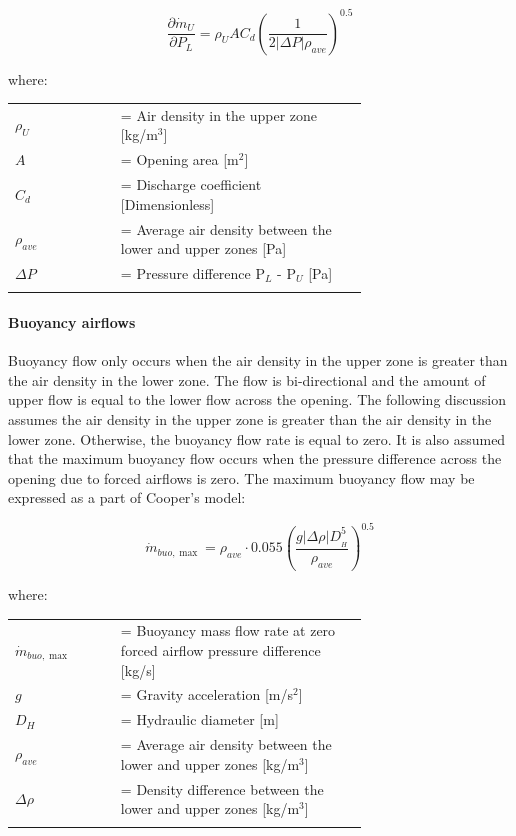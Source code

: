 \begin{equation}
\frac{{\partial \dot{m}_U}}{{\partial {P_L}}} = {\rho_U}A{C_d}{\left( {\frac{1}{{2\left| {\Delta P} \right|{\rho_{ave}}}}} \right)^{0.5}}
\end{equation}

where:
\begin{tabular}{lp{0.7\linewidth}}
\\
$\rho_U$ &= Air density in the upper zone [kg/m\(^{3}\)]\\
$A$ &= Opening area [m\(^{2}\)] \\
$C_{d}$ &= Discharge coefficient [Dimensionless] \\
$\rho_{ave}$ &= Average air density between the lower and upper zones [Pa] \\
$\Delta P$ &= Pressure difference P\(_{L}\) - P\(_{U}\) [Pa] \\
\\
\end{tabular}

\paragraph{Buoyancy airflows}\label{buoyancy-airflows}

Buoyancy flow only occurs when the air density in the upper zone is greater than the air density in the lower zone. The flow is bi-directional and the amount of upper flow is equal to the lower flow across the opening. The following discussion assumes the air density in the upper zone is greater than the air density in the lower zone. Otherwise, the buoyancy flow rate is equal to zero. It is also assumed that the maximum buoyancy flow occurs when the pressure difference across the opening due to forced airflows is zero. The maximum buoyancy flow may be expressed as a part of Cooper's model:

\begin{equation}
\dot{m}_{buo,\max} = {\rho_{ave}}\cdot0.055{\left( {\frac{{g\left| {\Delta \rho } \right|D_{_H}^5}}{{{\rho_{ave}}}}} \right)^{0.5}}
\end{equation}

where:

\begin{tabular}{lp{0.7\linewidth}}
\\
$\dot{m}_{buo,\max}$ &= Buoyancy mass flow rate at zero forced airflow pressure difference [kg/s]\\
$g$ &= Gravity acceleration [m/s\(^{2}\)]\\
$D_H$ &= Hydraulic diameter [m] \\
$\rho_{ave}$ &= Average air density between the lower and upper zones [kg/m\(^{3}\)]\\
$\Delta \rho$ &= Density difference between the lower and upper zones [kg/m\(^{3}\)]\\
\\
\end{tabular}

